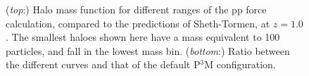 \begin{figure}
  \begin{center}
  \caption{ ({\it top}:) Halo mass function for different ranges of the pp force calculation, compared to the predictions of Sheth-Tormen, at $z = 1.0$. 
  The smallest haloes shown here have a mass equivalent to 100 particles, and fall in the lowest mass bin.
  ({\it bottom}:) Ratio between the different curves and that of the default P$^3$M configuration.}
    \label{fig:MassFunction_extpp}
  \end{center}
\end{figure}


